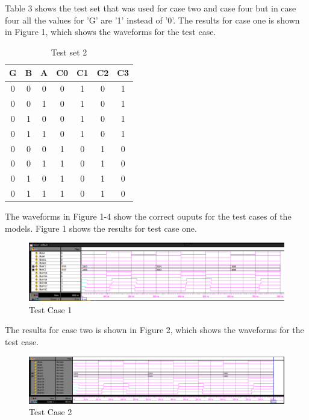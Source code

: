 \documentclass[CMPE]{KGCOEReport}
\begin{document}
Table 3 shows the test set that was used for case two and case four but in case four all the values for 'G' are '1' instead of '0'. The results for case one is shown in Figure 1, which shows the waveforms for the test case.

\begin{table}[H]
	\centering
	\caption{Test set 2}
	\label{tab:Table 3}
	\begin{tabular}{|c|c|c|c c c c|}
		\hline
		G & B & A & C0 & C1 & C2 & C3 \\ \hline
		0 & 0 & 0 & 0 & 1 & 0 & 1 \\ \hline
		0 & 0 & 1 & 0 & 1 & 0 & 1 \\ \hline
		0 & 1 & 0 & 0 & 1 & 0 & 1 \\ \hline
		0 & 1 & 1 & 0 & 1 & 0 & 1 \\ \hline
		0 & 0 & 0 & 1 & 0 & 1 & 0 \\ \hline
		0 & 0 & 1 & 1 & 0 & 1 & 0 \\ \hline
		0 & 1 & 0 & 1 & 0 & 1 & 0 \\ \hline
		0 & 1 & 1 & 1 & 0 & 1 & 0 \\ \hline
	\end{tabular}
\end{table}

The waveforms in Figure 1-4 show the correct ouputs for the test cases of the models. Figure 1 shows the results for test case one.
\begin{figure}[H]
	\centering
	\includegraphics[width=1\textwidth]{ModelSimLab11PT1}
	\caption{Test Case 1}
	\label{fig:Figure 1}
\end{figure}

The results for case two is shown in Figure 2, which shows the waveforms for the test case.

\begin{figure}[H]
	\centering
	\includegraphics[width=1\textwidth]{ModelSimLab11PT2}
	\caption{Test Case 2}
	\label{fig:Figure 2}
\end{figure}
\end{document}
